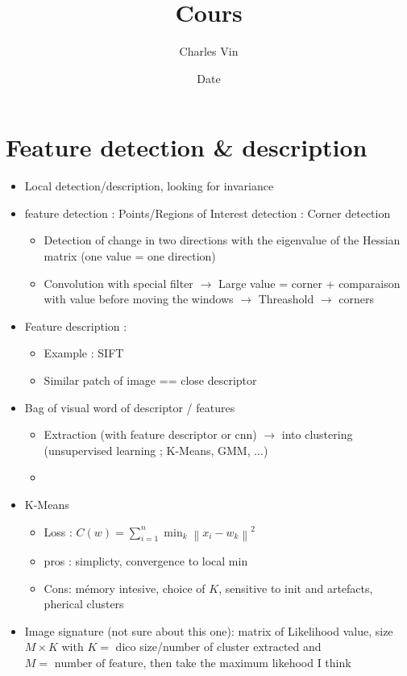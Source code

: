 \documentclass{article}
\title{Cours}
\author{Charles Vin}
\date{Date}
\theoremstyle{plain}%
\theoremstyle{definition}
\theoremstyle{remark}
\begin{document}
\maketitle


\section{Feature detection \& description}
\begin{itemize}
    \item Local detection/description, looking for invariance
    \item feature detection : Points/Regions of Interest detection : Corner detection \begin{itemize}
        \item Detection of change in two directions with the eigenvalue of the Hessian matrix (one value = one direction)
        \item Convolution with special filter $\rightarrow$ Large value = corner + comparaison with value before moving the windows $\rightarrow$ Threashold $\rightarrow$ corners
    \end{itemize}
    \item Feature description : \begin{itemize}
        \item Example : SIFT
        \item Similar patch of image == close descriptor
    \end{itemize}
    \item Bag of visual word of descriptor / features \begin{itemize}
        \item Extraction (with feature descriptor or cnn) $\rightarrow$ into clustering (unsupervised learning ; K-Means, GMM, ...)
        \item
    \end{itemize}
    \item K-Means \begin{itemize}
        \item Loss : $ C(w) = \sum_{i=1}^{n} \min _k \left\| x_i - w_k  \right\| ^2 $
        \item pros : simplicty, convergence to local min
        \item Cons: mémory intesive, choice of $ K $, sensitive to init and artefacts, pherical clusters
    \end{itemize}
    \item Image signature (not sure about this one): matrix of Likelihood value, size $ M \times K $ with $ K = $ dico size/number of cluster extracted and $ M = \text{ number of feature} $, then take the maximum likehood I think
\end{itemize}
\end{document}
